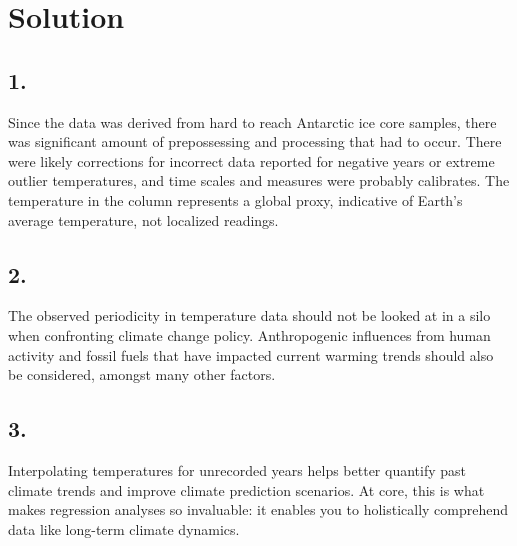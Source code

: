 \documentclass[submit]{harvardml}
\newenvironment{solution}
  {\color{blue}\section*{Solution}}
{}
\begin{document}
\begin{solution}
\subsection*{1.} Since the data was derived from hard to reach Antarctic ice core samples, there was significant amount of prepossessing and processing that had to occur. There were likely corrections for incorrect data reported for negative years or extreme outlier temperatures, and time scales and measures were probably calibrates. The temperature in the column represents a global proxy, indicative of Earth's average temperature, not localized readings.

\subsection*{2.} The observed periodicity in temperature data should not be looked at in a silo when confronting climate change policy. Anthropogenic influences from human activity and fossil fuels that have impacted current warming trends should also be considered, amongst many other factors. 

\subsection*{3.} Interpolating temperatures for unrecorded years helps better quantify past climate trends and improve climate prediction scenarios. At core, this is what makes regression analyses so invaluable: it enables you to holistically comprehend data like long-term climate dynamics. 

\end{solution}

\end{document}

